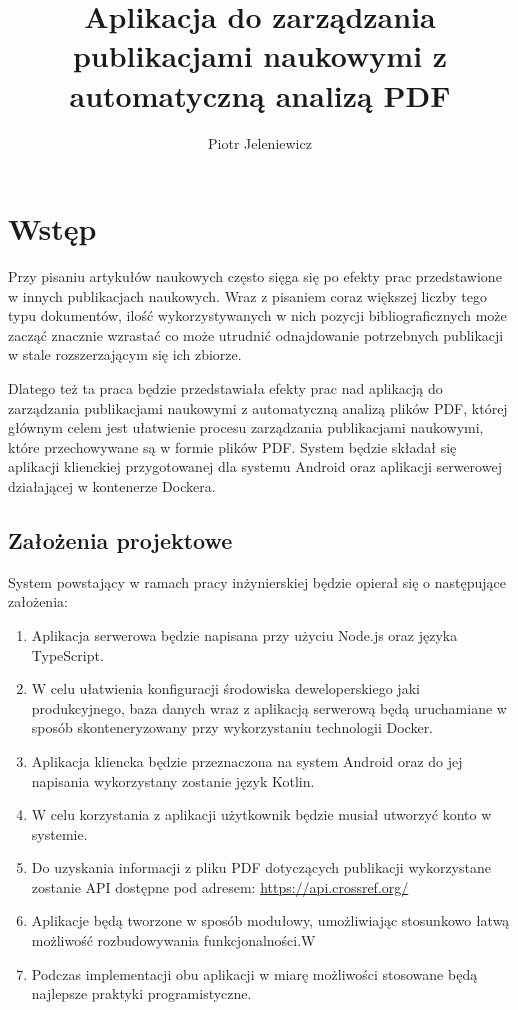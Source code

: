 \documentclass[a4paper,12pt,twoside,openany]{report}
\title{Aplikacja do zarządzania publikacjami naukowymi z automatyczną analizą PDF}
\author{Piotr Jeleniewicz}
\begin{document}
\maketitle

\chapter{Wstęp}
Przy pisaniu artykułów naukowych często sięga się po efekty prac przedstawione w innych publikacjach naukowych. Wraz z pisaniem coraz większej liczby tego typu dokumentów, ilość wykorzystywanych w nich pozycji bibliograficznych może zacząć znacznie wzrastać co może utrudnić odnajdowanie potrzebnych publikacji w stale rozszerzającym się ich zbiorze. 

Dlatego też ta praca będzie przedstawiała efekty prac nad aplikacją do zarządzania publikacjami naukowymi z automatyczną analizą plików PDF, której głównym celem jest ułatwienie procesu zarządzania publikacjami naukowymi, które przechowywane są w formie plików PDF. System będzie składał się aplikacji klienckiej przygotowanej dla systemu Android oraz aplikacji serwerowej działającej w kontenerze Dockera.
\section{Założenia projektowe}

\hspace{10pt} 	System powstający w ramach pracy inżynierskiej będzie opierał się o następujące założenia: 	
\begin{enumerate}
	\item Aplikacja serwerowa będzie napisana przy użyciu Node.js oraz języka TypeScript.
	\item W celu ułatwienia konfiguracji środowiska deweloperskiego jaki produkcyjnego, baza danych wraz z aplikacją serwerową będą uruchamiane w sposób skonteneryzowany przy wykorzystaniu technologii Docker. 
	\item Aplikacja kliencka będzie przeznaczona na system Android oraz do jej napisania wykorzystany zostanie język Kotlin.
	\item W celu korzystania z aplikacji użytkownik będzie musiał utworzyć konto w systemie.
	\item Do uzyskania informacji z pliku PDF dotyczących publikacji wykorzystane zostanie API dostępne pod adresem: \newline \url{https://api.crossref.org/} 
	\item Aplikacje będą tworzone w sposób modułowy, umożliwiając stosunkowo łatwą możliwość rozbudowywania funkcjonalności.W
	\item Podczas implementacji obu aplikacji w miarę możliwości stosowane będą najlepsze praktyki programistyczne.
\end{enumerate}
\end{document}
